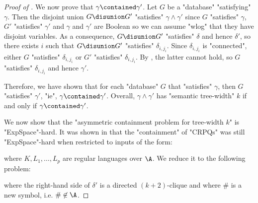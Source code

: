 \begin{proof}[Proof of ]
    We now prove that $\gamma \contained \gamma'$. Let $G$ be a
    "database" "satisfying" $\gamma$. Then the disjoint union $G \disunion G'$ "satisfies" $\gamma \land \gamma'$
    since $G$ "satisfies" $\gamma$, $G'$ "satisfies" $\gamma'$ and $\gamma$ and $\gamma'$
    are Boolean so we can assume "wlog" that they have disjoint variables.
    As a consequence, $G \disunion G'$ "satisfies" $\delta$ and hence $\delta'$,
    so there exists $i$ such that $G \disunion G'$ "satisfies" $\delta_{i,j_i}$.
    Since $\delta_{i,j_i}$ is "connected", either $G$ "satisfies"
    $\delta_{i,j_i}$ or $G'$ "satisfies" $\delta_{i,j_i}$.
    By , the latter cannot hold,
    so $G$ "satisfies" $\delta_{i,j_i}$ and hence $\gamma'$.

    Therefore, we have shown that for each "database" $G$ that "satisfies" 
    $\gamma$, then $G$ "satisfies" $\gamma'$, "ie", $\gamma \contained \gamma'$. Overall,
    $\gamma \land \gamma'$ has "semantic tree-width" $k$ if and only if
    $\gamma \contained \gamma'$.

    \medskip

    We now show that the "asymmetric containment problem for tree-width $k$" is
    "ExpSpace"-hard.
    It was shown in \cite[Lemma 8]{Figueira2020Containment} that
    the "containment" of "CRPQs" was still "ExpSpace"-hard
    when restricted to inputs of the form:
    \begin{center}
    \end{center}
    where $K,L_1,\hdots,L_p$ are regular languages over $\A$.
    We reduce it to the following problem:
    \begin{center}
    \end{center}
    where the right-hand side of $\delta'$ is a directed $(k+2)$-clique
    and where $\#$ is a new symbol, i.e. $\# \not\in \A$.


\end{proof}
